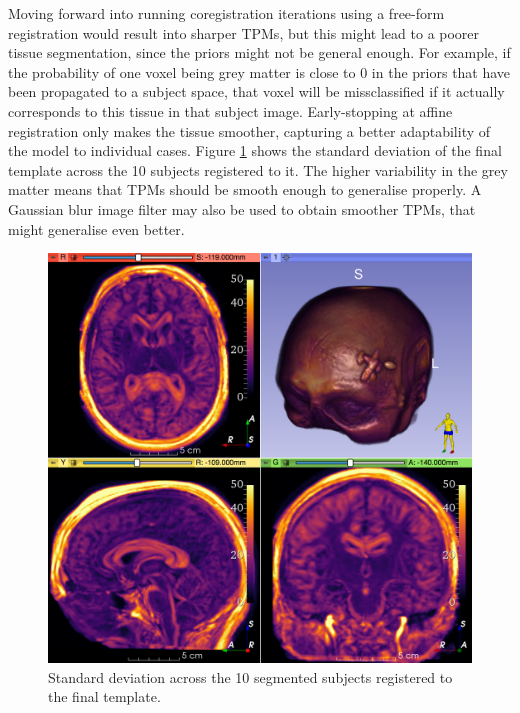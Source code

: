 Moving forward into running coregistration iterations using a free-form registration would result into sharper TPMs, but this might lead to a poorer tissue segmentation, since the priors might not be general enough. For example, if the probability of one voxel being grey matter is close to 0 in the priors that have been propagated to a subject space, that voxel will be missclassified if it actually corresponds to this tissue in that subject image. Early-stopping at affine registration only makes the tissue smoother, capturing a better adaptability of the model to individual cases. Figure \ref{fig:template-std} shows the standard deviation of the final template across the 10 subjects registered to it. The higher variability in the grey matter means that TPMs should be smooth enough to generalise properly. A Gaussian blur image filter may also be used to obtain smoother TPMs, that might generalise even better.

\begin{figure}
  \includegraphics[width=\textwidth]{figures/affine_9_std}
  \centering
  \caption{Standard deviation across the 10 segmented subjects registered to the final template.}
  \label{fig:template-std}
\end{figure}
